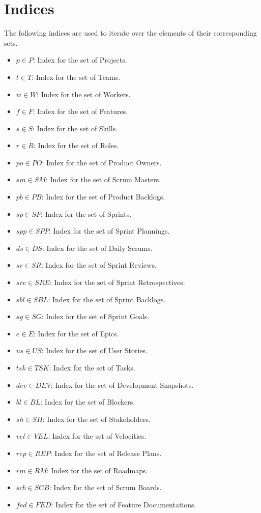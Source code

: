 \documentclass[11pt, a4paper]{article}
\begin{document}
\section{Indices}
The following indices are used to iterate over the elements of their corresponding sets.

\begin{itemize}
    \item $p \in P$: Index for the set of Projects.
    \item $t \in T$: Index for the set of Teams.
    \item $w \in W$: Index for the set of Workers.
    \item $f \in F$: Index for the set of Features.
    \item $s \in S$: Index for the set of Skills.
    \item $r \in R$: Index for the set of Roles.
    \item $po \in PO$: Index for the set of Product Owners.
    \item $sm \in SM$: Index for the set of Scrum Masters.
    \item $pb \in PB$: Index for the set of Product Backlogs.
    \item $sp \in SP$: Index for the set of Sprints.
    \item $spp \in SPP$: Index for the set of Sprint Plannings.
    \item $ds \in DS$: Index for the set of Daily Scrums.
    \item $sr \in SR$: Index for the set of Sprint Reviews.
    \item $sre \in SRE$: Index for the set of Sprint Retrospectives.
    \item $sbl \in SBL$: Index for the set of Sprint Backlogs.
    \item $sg \in SG$: Index for the set of Sprint Goals.
    \item $e \in E$: Index for the set of Epics.
    \item $us \in US$: Index for the set of User Stories.
    \item $tsk \in TSK$: Index for the set of Tasks.
    \item $dev \in DEV$: Index for the set of Development Snapshots.
    \item $bl \in BL$: Index for the set of Blockers.
    \item $sh \in SH$: Index for the set of Stakeholders.
    \item $vel \in VEL$: Index for the set of Velocities.
    \item $rep \in REP$: Index for the set of Release Plans.
    \item $rm \in RM$: Index for the set of Roadmaps.
    \item $scb \in SCB$: Index for the set of Scrum Boards.
    \item $fed \in FED$: Index for the set of Feature Documentations.
\end{itemize}
\end{document}
